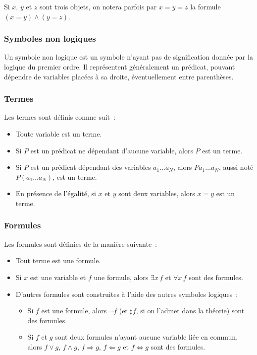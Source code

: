 Si $x$, $y$ et $z$ sont trois objets, on notera parfois par $x = y = z$ la formule $(x = y) \wedge (y = z)$. 

\subsubsection{Symboles non logiques}

Un symbole non logique est un symbole n'ayant pas de signification donnée par la logique du premier ordre. 
Il représentent généralement un prédicat, pouvant dépendre de variables placées à sa droite, éventuellement entre parenthèses.

\subsubsection{Termes}

Les termes sont définis comme suit : 
\begin{itemize}
    \item Toute variable est un terme. 
    \item Si $P$ est un prédicat ne dépendant d'aucune variable, alors $P$ est un terme.
    \item Si $P$ est un prédicat dépendant des variables $a_1 \dots a_N$, alors $P a_1 \dots a_N$, aussi noté $P (a_1 \dots a_N)$, est un terme. 
    \item En présence de l'égalité, si $x$ et $y$ sont deux variables, alors $x = y$ est un terme.
\end{itemize}

\subsubsection{Formules}

Les formules sont définies de la manière suivante : 
\begin{itemize}
    \item Tout terme est une formule. 
    \item Si $x$ est une variable et $f$ une formule, alors $\exists x \, f$ et $\forall x \, f$ sont des formules. 
    \item D'autres formules sont construites à l'aide des autres symboles logiques : 
    \begin{itemize}
        \item Si $f$ est une formule, alors $\neg f$ (et $\sharp f$, si on l'admet dans la théorie) sont des formules.
        \item Si $f$ et $g$ sont deux formules n'ayant aucune variable liée en commun, alors $f \vee g$, $f \wedge g$, $f \Rightarrow g$, $f \Leftarrow g$ et $f \Leftrightarrow g$ sont des formules.
    \end{itemize}
\end{itemize}


